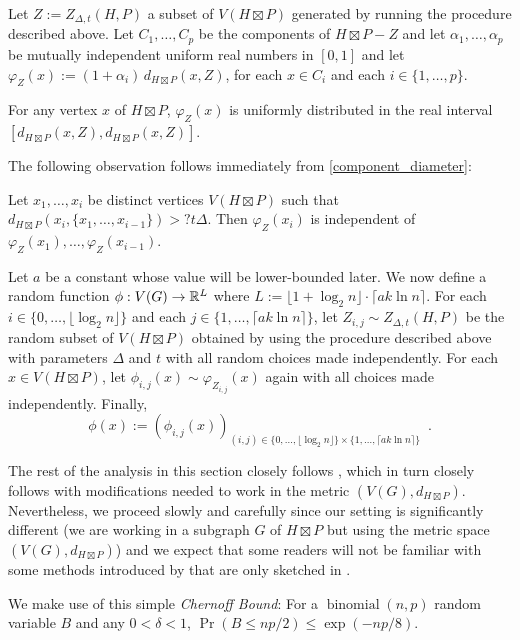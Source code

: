 \documentclass{patmorin}
\newcommand{\defin}[1]{\emph{\textcolor{brightmaroon}{#1}}}
\begin{document}
Let $Z:=Z_{\Delta,t}(H,P)$ a subset of $V(H\boxtimes P)$ generated by running the procedure described above.  Let $C_1,\ldots,C_p$ be the components of $H\boxtimes P-Z$ and let $\alpha_1,\ldots,\alpha_p$ be mutually independent uniform real numbers in $[0,1]$ and let $\varphi_Z(x):=(1+\alpha_i)\,d_{H\boxtimes P}(x,Z)$, for each $x\in C_i$ and each $i\in\{1,\ldots,p\}$.

\begin{obs}\label{uniform}
  For any vertex $x$ of $H\boxtimes P$, $\varphi_Z(x)$ is uniformly distributed in the real interval $[d_{H\boxtimes P}(x,Z), d_{H\boxtimes P}(x,Z)]$.
\end{obs}

The following observation follows immediately from \cref{component_diameter}:
\begin{obs}\label{independent}
  Let $x_1,\ldots,x_i$ be distinct vertices $V(H\boxtimes P)$ such that $d_{H\boxtimes P}(x_i,\{x_1,\ldots,x_{i-1}\})> ?t\Delta$. Then $\varphi_Z(x_i)$ is independent of $\varphi_Z(x_1),\ldots,\varphi_Z(x_{i-1})$.
\end{obs}


Let $a$ be a constant whose value will be lower-bounded later.  We now define a random function $\phi:V(G)\to\mathbb{R}^{L}$ where $L:=\lfloor 1+\log_2 n\rfloor\cdot\lceil a k\ln n\rceil$. For each $i\in\{0,\ldots,\lfloor \log_2 n\rfloor\}$ and each $j\in\{1,\ldots,\lceil a k\ln n\rceil\}$, let $Z_{i,j}\sim Z_{\Delta,t}(H,P)$ be the random subset of $V(H\boxtimes P)$ obtained by using the procedure described above with parameters $\Delta$ and $t$ with all random choices made independently.  For each $x\in V(H\boxtimes P)$, let $\phi_{i,j}(x)\sim \varphi_{Z_{i,j}}(x)$ again with all choices made independently.  Finally,
\[
   \phi(x) := (\phi_{i,j}(x))_{(i,j)\in \{0,\ldots,\lfloor \log_2 n\rfloor\}\times\{1,\ldots,\lceil a k\ln n\rceil\}} \enspace .
\]

The rest of the analysis in this section closely follows \citet{rao:small}, which in turn closely follows \citet{feige:approximating} with modifications needed to work in the metric $(V(G),d_{H\boxtimes P})$.  Nevertheless, we proceed slowly and carefully since our setting is significantly different (we are working in a subgraph $G$ of $H\boxtimes P$ but using the metric space $(V(G),d_{H\boxtimes P})$) and we expect that some readers will not be familiar with some methods introduced by \citet{feige:approximating} that are only sketched in \citet{rao:small}.


We make use of this simple \defin{Chernoff Bound}: For a $\operatorname{binomial}(n,p)$ random variable $B$ and any $0<\delta<1$, $\Pr(B \le np/2) \le \exp(-np/8)$.
\end{document}
